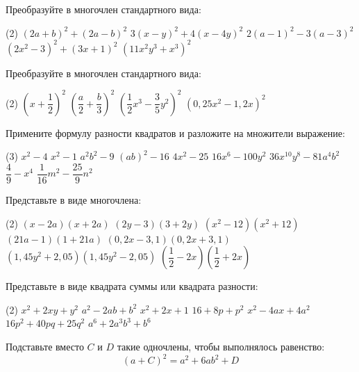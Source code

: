 \begin{class}[number=6]
	\begin{listofex}
		\item Преобразуйте в многочлен стандартного вида:
		\begin{tasks}(2)
			\task \( (2a+b)^2+(2a-b)^2 \)
			\task \( 3(x-y)^2+4(x-4y)^2 \)
			\task \( 2(a-1)^2-3(a-3)^2 \)
			\task \( (2x^2-3)^2+(3x+1)^2 \)
			\task \( (11x^2y^3+x^3)^2 \)
		\end{tasks}
		\item Преобразуйте в многочлен стандартного вида:
		\begin{tasks}(2)
			\task \( \left( x+\dfrac{1}{2} \right)^2 \)
			\task \( \left( \dfrac{a}{2}+\dfrac{b}{3} \right)^2 \)
			\task \( \left( \dfrac{1}{2}x^3-\dfrac{3}{5}y^2 \right)^2 \)
			\task \( (0,25x^2-1,2x)^2 \)
		\end{tasks}
		\item Примените формулу разности квадратов и разложите на множители выражение:
		\begin{tasks}(3)
			\task \( x^2-4 \)
			\task \( x^2-1 \)
			\task \( a^2b^2-9 \)
			\task \( (ab)^2-16 \)
			\task \( 4x^2-25 \)
			\task \( 16x^6-100y^2 \)
			\task \( 36x^{10}y^8-81a^4b^2 \)
			\task \( \dfrac{4}{9}-x^4 \)
			\task \( \dfrac{1}{16}m^2-\dfrac{25}{9}n^2 \)
		\end{tasks}
		\item Представьте в виде многочлена:
		\begin{tasks}(2)
			\task \( (x-2a)(x+2a) \)
			\task \( (2y-3)(3+2y) \)
			\task \( (x^2-12)(x^2+12) \)
			\task \( (21a-1)(1+21a) \)
			\task \( (0,2x-3,1)(0,2x+3,1) \)
			\task \( (1,45y^2+2,05)(1,45y^2-2,05) \)
			\task \( \left( \dfrac{1}{2}-2x \right)\left( \dfrac{1}{2}+2x \right) \)
		\end{tasks}
		\item Представьте в виде квадрата суммы или квадрата разности:
		\begin{tasks}(2)
			\task \( x^2+2xy+y^2 \)
			\task \( a^2-2ab+b^2 \)
			\task \( x^2+2x+1 \)
			\task \( 16+8p+p^2 \)
			\task \( x^2-4ax+4a^2 \)
			\task \( 16p^2+40pq+25q^2 \)
			\task \( a^6+2a^3b^3+b^6 \)
		\end{tasks}
		\item Подставьте вместо \( C \) и \( D \) такие одночлены, чтобы выполнялось равенство:
		\[ (a + C)^2 = a^2 + 6ab^2 + D \]
	\end{listofex}
\end{class}

